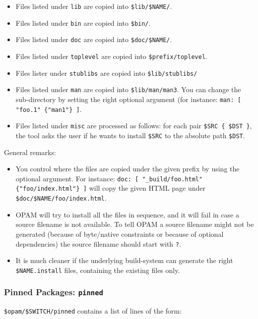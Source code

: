 \documentclass[a4paper,11pt]{article}
\begin{document}
\begin{itemize}
\item Files listed under {\tt lib} are copied into \verb+$lib/$NAME/+.
\item Files listed under {\tt bin} are copied into \verb+$bin/+.
\item Files listed under {\tt doc} are copied into \verb+$doc/$NAME/+.
\item Files listed under {\tt toplevel} are copied into \verb+$prefix/toplevel+.
\item Files lister under {\tt stublibs} are copied into \verb+$lib/stublibs/+
\item Files listed under {\tt man} are copied into
  \verb+$lib/man/man3+. You can change the sub-directory by setting
  the right optional argument (for instance:
  \verb+man: [ "foo.1" {"man1"} ]+.
\item Files listed under {\tt misc} are processed as follows:
  for each pair \verb+$SRC { $DST }+, the tool asks the user if
  he wants to install \verb+$SRC+ to the absolute path \verb+$DST+.
\end{itemize}

General remarks:
\begin{itemize}

\item You control where the files are copied under the given prefix by
  using the optional argument. For instance:
  \verb+doc: [ "_build/foo.html" {"foo/index.html"} ]+ will copy the
  given HTML page under \verb+$doc/$NAME/foo/index.html+.

\item OPAM will try to install all the files in sequence, and it will
  fail in case a source filename is not available. To tell OPAM a
  source filename might not be generated (because of byte/native
  constraints or because of optional dependencies) the source filename
  should start with \verb+?+.

\item It is much cleaner if the underlying build-system can generate
  the right \verb+$NAME.install+ files, containing the existing files only.

\end{itemize}

\subsubsection{Pinned Packages: {\tt pinned}}

\verb+$opam/$SWITCH/pinned+ contains a list of lines of the form:
\end{document}
